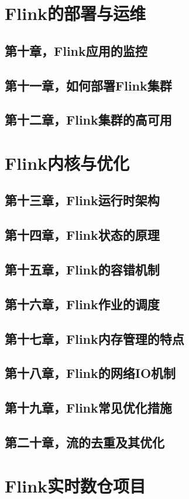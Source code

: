 \documentclass[cn,11pt,chinese]{elegantbook}
\begin{document}
\part{Flink的部署与运维}

\chapter{第十章，Flink应用的监控}

\chapter{第十一章，如何部署Flink集群}

\chapter{第十二章，Flink集群的高可用}

\part{Flink内核与优化}

\chapter{第十三章，Flink运行时架构}

\chapter{第十四章，Flink状态的原理}

\chapter{第十五章，Flink的容错机制}

\chapter{第十六章，Flink作业的调度}

\chapter{第十七章，Flink内存管理的特点}

\chapter{第十八章，Flink的网络IO机制}

\chapter{第十九章，Flink常见优化措施}

\chapter{第二十章，流的去重及其优化}

\part{Flink实时数仓项目}
\end{document}
